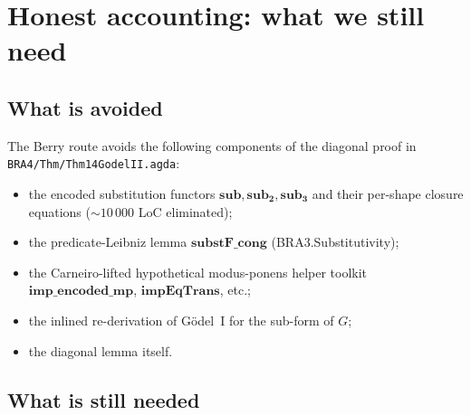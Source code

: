 \documentclass[11pt]{article}
\theoremstyle{plain}
\theoremstyle{definition}
\theoremstyle{remark}
\begin{document}
\section{Honest accounting: what we still need}

\subsection{What is avoided}

The Berry route avoids the following components of the diagonal proof
in \verb|BRA4/Thm/Thm14GodelII.agda|:
\begin{itemize}
\item the encoded substitution functors $\mathbf{sub}, \mathbf{sub_2},
\mathbf{sub_3}$ and their per-shape closure equations
($\sim 10\,000$ LoC eliminated);
\item the predicate-Leibniz lemma $\mathbf{substF\_cong}$
(BRA3.Substitutivity);
\item the Carneiro-lifted hypothetical modus-ponens helper toolkit
$\mathbf{imp\_encoded\_mp}$, $\mathbf{impEqTrans}$, etc.;
\item the inlined re-derivation of G\"odel~I for the sub-form of $G$;
\item the diagonal lemma itself.
\end{itemize}

\subsection{What is still needed}
\end{document}
